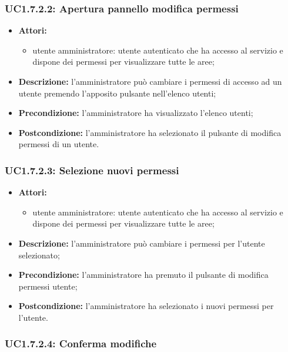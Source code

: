\subsubsection{UC1.7.2.2: Apertura pannello modifica permessi}

\begin{itemize}
	\item \textbf{Attori:}
	\begin{itemize}
		\item utente amministratore: utente autenticato che ha accesso al servizio e dispone dei permessi per visualizzare tutte le aree;
	\end{itemize}
	\item \textbf{Descrizione:} l'amministratore può cambiare i permessi di accesso ad un utente premendo l'apposito pulsante nell'elenco utenti;
	\item \textbf{Precondizione:} l'amministratore ha visualizzato l'elenco utenti;
	\item \textbf{Postcondizione:} l'amministratore ha selezionato il pulsante di modifica permessi di un utente.
\end{itemize}

\subsubsection{UC1.7.2.3: Selezione nuovi permessi}

\begin{itemize}
	\item \textbf{Attori:}
	\begin{itemize}
		\item utente amministratore: utente autenticato che ha accesso al servizio e dispone dei permessi per visualizzare tutte le aree;
	\end{itemize}
	\item \textbf{Descrizione:} l'amministratore può cambiare i permessi per l'utente selezionato;
	\item \textbf{Precondizione:} l'amministratore ha premuto il pulsante di modifica permessi utente;
	\item \textbf{Postcondizione:} l'amministratore ha selezionato i nuovi permessi per l'utente.
\end{itemize}

\subsubsection{UC1.7.2.4: Conferma modifiche}

